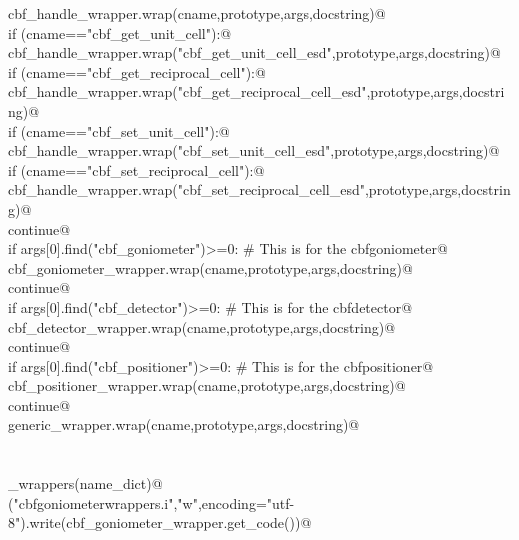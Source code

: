 \documentclass[10pt,a4paper,twoside,notitlepage]{article}
\begin{document}
\begin{flushleft}
\begin{minipage}{\linewidth}
\begin{list}{}{}
\mbox{}\verb@         cbf_handle_wrapper.wrap(cname,prototype,args,docstring)@\\
\mbox{}\verb@         if (cname=="cbf_get_unit_cell"):@\\
\mbox{}\verb@           cbf_handle_wrapper.wrap("cbf_get_unit_cell_esd",prototype,args,docstring)@\\
\mbox{}\verb@         if (cname=="cbf_get_reciprocal_cell"):@\\
\mbox{}\verb@           cbf_handle_wrapper.wrap("cbf_get_reciprocal_cell_esd",prototype,args,docstring)@\\
\mbox{}\verb@         if (cname=="cbf_set_unit_cell"):@\\
\mbox{}\verb@           cbf_handle_wrapper.wrap("cbf_set_unit_cell_esd",prototype,args,docstring)@\\
\mbox{}\verb@         if (cname=="cbf_set_reciprocal_cell"):@\\
\mbox{}\verb@           cbf_handle_wrapper.wrap("cbf_set_reciprocal_cell_esd",prototype,args,docstring)@\\
\mbox{}\verb@         continue@\\
\mbox{}\verb@      if args[0].find("cbf_goniometer")>=0: # This is for the cbfgoniometer@\\
\mbox{}\verb@         cbf_goniometer_wrapper.wrap(cname,prototype,args,docstring)@\\
\mbox{}\verb@         continue@\\
\mbox{}\verb@      if args[0].find("cbf_detector")>=0: # This is for the cbfdetector@\\
\mbox{}\verb@         cbf_detector_wrapper.wrap(cname,prototype,args,docstring)@\\
\mbox{}\verb@         continue@\\
\mbox{}\verb@      if args[0].find("cbf_positioner")>=0: # This is for the cbfpositioner@\\
\mbox{}\verb@         cbf_positioner_wrapper.wrap(cname,prototype,args,docstring)@\\
\mbox{}\verb@         continue@\\
\mbox{}\verb@      generic_wrapper.wrap(cname,prototype,args,docstring)@\\
\mbox{}\verb@@\\
\mbox{}\verb@@\\
\mbox{}\verb@generate_wrappers(name_dict)@\\
\mbox{}\verb@open("cbfgoniometerwrappers.i","w",encoding="utf-8").write(cbf_goniometer_wrapper.get_code())@\\

\end{list}
\end{minipage}
\end{flushleft}
\end{document}
